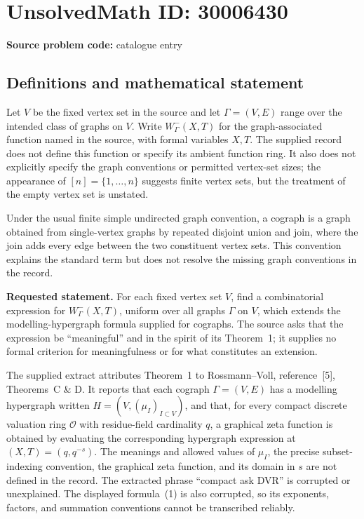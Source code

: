 \documentclass[11pt]{article}
\begin{document}
\section*{UnsolvedMath ID: 30006430}
\textbf{Source problem code:} catalogue entry
\subsection{Definitions and mathematical statement}
Let \(V\) be the fixed vertex set in the source and let \(\Gamma=(V,E)\) range over the intended class of graphs on \(V\). Write \(W^-_\Gamma(X,T)\) for the graph-associated function named in the source, with formal variables \(X,T\). The supplied record does not define this function or specify its ambient function ring. It also does not explicitly specify the graph conventions or permitted vertex-set sizes; the appearance of \([n]=\{1,\ldots,n\}\) suggests finite vertex sets, but the treatment of the empty vertex set is unstated.

Under the usual finite simple undirected graph convention, a cograph is a graph obtained from single-vertex graphs by repeated disjoint union and join, where the join adds every edge between the two constituent vertex sets. This convention explains the standard term but does not resolve the missing graph conventions in the record.

\textbf{Requested statement.} For each fixed vertex set \(V\), find a combinatorial expression for \(W^-_\Gamma(X,T)\), uniform over all graphs \(\Gamma\) on \(V\), which extends the modelling-hypergraph formula supplied for cographs. The source asks that the expression be ``meaningful'' and in the spirit of its Theorem~1; it supplies no formal criterion for meaningfulness or for what constitutes an extension.

The supplied extract attributes Theorem~1 to Rossmann--Voll, reference~[5], Theorems~C \& D. It reports that each cograph \(\Gamma=(V,E)\) has a modelling hypergraph written \(H=(V,(\mu_I)_{I\subset V})\), and that, for every compact discrete valuation ring \(\mathcal O\) with residue-field cardinality \(q\), a graphical zeta function is obtained by evaluating the corresponding hypergraph expression at \((X,T)=(q,q^{-s})\). The meanings and allowed values of \(\mu_I\), the precise subset-indexing convention, the graphical zeta function, and its domain in \(s\) are not defined in the record. The extracted phrase ``compact ask DVR'' is corrupted or unexplained. The displayed formula~(1) is also corrupted, so its exponents, factors, and summation conventions cannot be transcribed reliably.
\end{document}
